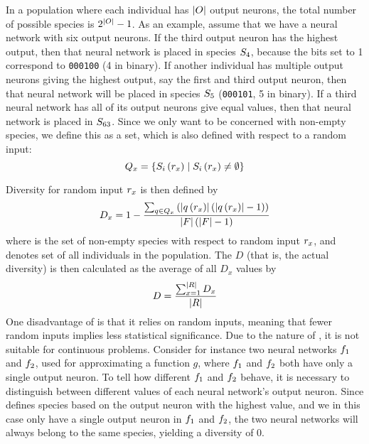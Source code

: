 In a population where each individual has $\lvert O\rvert$ output neurons, the total number of possible species is $2^{\lvert O\rvert} - 1$.  As an example, assume that we have a neural network with six output neurons. If the third output neuron has the highest output, then that neural network is placed in species $S_4$, because the bits set to 1 correspond to \texttt{000100} (4 in binary). If another individual has multiple output neurons giving the highest output, say the first and third output neuron, then that neural network will be placed in species $S_5$ (\texttt{000101}, 5 in binary). If a third neural network has all of its output neurons give equal values, then that neural network is placed in $S_{63}$.
Since we only want to be concerned with non-empty species, we define this as a set, which is also defined with respect to a random input:
\begin{equation*}\label{eq:nonemptyspecies}
  Q_{x} = \left\{ S_{i}\left(r_x\right) \mid S_{i}\left(r_x\right) \neq \emptyset \right\}
\end{equation*}

Diversity for random input $r_x$ is then defined by
%
\begin{equation*}\label{eq:nntd}
  D_x = 1 - \frac{\sum_{q \in Q_{x}}\left(\lvert q\left(r_x\right)\rvert\left(\lvert q\left(r_x\right)\rvert - 1\right)\right)}{\lvert F\rvert\left(\lvert F\rvert - 1\right)}
\end{equation*}
%
where  is the set of non-empty species with respect to random input $r_x$, and \indset{} denotes set of all individuals in the population. The \dia{} $D$ (that is, the actual diversity) is then calculated as the average of all \ransetl{} $D_x$ values by
%
\begin{equation}\label{eq:nntdavg}
  D =\frac{\sum_{x=1}^{\lvert R\rvert}{D_x}}{\lvert R\rvert}
\end{equation}
%
One disadvantage of \dia{} is that it relies on random inputs, meaning that fewer random inputs implies less statistical significance. Due to the nature of \dia, it is not suitable for continuous problems. Consider for instance two neural networks $f_1$ and $f_2$, used for approximating a function $g$, where $f_1$ and $f_2$ both have only a single output neuron. To tell how different $f_1$ and $f_2$ behave, it is necessary to distinguish between different values of each neural network's output neuron. Since \dia{} defines species based on the output neuron with the highest value, and we in this case only have a single output neuron in $f_1$ and $f_2$, the two neural networks will always belong to the same species, yielding a diversity of 0.  

